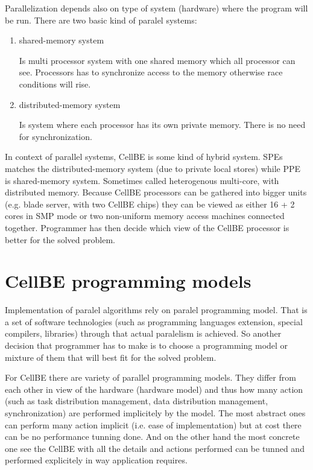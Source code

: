 Parallelization depends also on type of system (hardware) where the program will be run. There are two basic kind of paralel systems:
\begin{enumerate}
\item {shared-memory system}
\par
Is multi processor system with one shared memory which all processor can see. Processors has to synchronize access to the memory otherwise race conditions will rise.

\item {distributed-memory system}
\par
Is system where each processor has its own private memory. There is no need for synchronization.
\end{enumerate}

In context of parallel systems, CellBE is some kind of hybrid system. SPEs matches the distributed-memory system (due to private local stores) while PPE is shared-memory system. Sometimes called heterogenous multi-core, with distributed memory. Because CellBE processors can be gathered into bigger units (e.g. blade server, with two CellBE chips) they can be viewed as either 16 + 2 cores in SMP mode or two non-uniform memory access machines connected together. Programmer has then decide which view of the CellBE processor is better for the solved problem.

\section{CellBE programming models}

Implementation of paralel algorithms rely on paralel programming model. That is a set of software technologies (such as programming languages extension, special compilers, libraries) through that actual paralelism is achieved. So another decision that programmer has to make is to choose a programming model or mixture of them that will best fit for the solved problem.

For CellBE there are variety of parallel programming models. They differ from each other in view of the hardware (hardware model) and thus how many action (such as task distribution management, data distribution management, synchronization) are performed implicitely by the model. The most abstract ones can perform many action implicit (i.e. ease of implementation) but at cost there can be no performance tunning done. And on the other hand the most concrete one see the CellBE with all the details and actions performed can be tunned and performed explicitely in way application requires.

